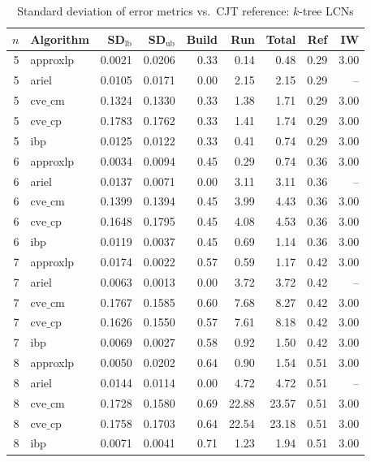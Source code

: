 \documentclass{article}
\begin{document}
\begin{table}[ht]
\centering
\caption{Standard deviation of error metrics vs.\ CJT reference: $k$-tree LCNs}
\begin{tabular}{rlrrrrrrr}
\toprule
 $n$ & Algorithm & SD$_{\text{lb}}$ & SD$_{\text{ub}}$ & Build & Run & Total & Ref & IW \\
\midrule
 5 & approxlp & 0.0021 & 0.0206 & 0.33 & 0.14 & 0.48 & 0.29 & 3.00 \\
 5 & ariel & 0.0105 & 0.0171 & 0.00 & 2.15 & 2.15 & 0.29 & -- \\
 5 & $\text{cve\_cm}$ & 0.1324 & 0.1330 & 0.33 & 1.38 & 1.71 & 0.29 & 3.00 \\
 5 & $\text{cve\_cp}$ & 0.1783 & 0.1762 & 0.33 & 1.41 & 1.74 & 0.29 & 3.00 \\
 5 & ibp & 0.0125 & 0.0122 & 0.33 & 0.41 & 0.74 & 0.29 & 3.00 \\
 \hline
 6 & approxlp & 0.0034 & 0.0094 & 0.45 & 0.29 & 0.74 & 0.36 & 3.00 \\
 6 & ariel & 0.0137 & 0.0071 & 0.00 & 3.11 & 3.11 & 0.36 & -- \\
 6 & $\text{cve\_cm}$ & 0.1399 & 0.1394 & 0.45 & 3.99 & 4.43 & 0.36 & 3.00 \\
 6 & $\text{cve\_cp}$ & 0.1648 & 0.1795 & 0.45 & 4.08 & 4.53 & 0.36 & 3.00 \\
 6 & ibp & 0.0119 & 0.0037 & 0.45 & 0.69 & 1.14 & 0.36 & 3.00 \\
 \hline
 7 & approxlp & 0.0174 & 0.0022 & 0.57 & 0.59 & 1.17 & 0.42 & 3.00 \\
 7 & ariel & 0.0063 & 0.0013 & 0.00 & 3.72 & 3.72 & 0.42 & -- \\
 7 & $\text{cve\_cm}$ & 0.1767 & 0.1585 & 0.60 & 7.68 & 8.27 & 0.42 & 3.00 \\
 7 & $\text{cve\_cp}$ & 0.1626 & 0.1550 & 0.57 & 7.61 & 8.18 & 0.42 & 3.00 \\
 7 & ibp & 0.0069 & 0.0027 & 0.58 & 0.92 & 1.50 & 0.42 & 3.00 \\
 \hline
 8 & approxlp & 0.0050 & 0.0202 & 0.64 & 0.90 & 1.54 & 0.51 & 3.00 \\
 8 & ariel & 0.0144 & 0.0114 & 0.00 & 4.72 & 4.72 & 0.51 & -- \\
 8 & $\text{cve\_cm}$ & 0.1728 & 0.1580 & 0.69 & 22.88 & 23.57 & 0.51 & 3.00 \\
 8 & $\text{cve\_cp}$ & 0.1758 & 0.1703 & 0.64 & 22.54 & 23.18 & 0.51 & 3.00 \\
 8 & ibp & 0.0071 & 0.0041 & 0.71 & 1.23 & 1.94 & 0.51 & 3.00 \\

\end{tabular}
\end{table}
\end{document}
